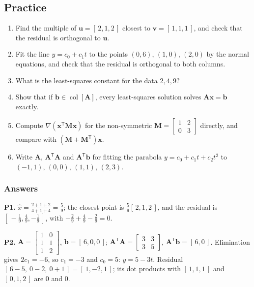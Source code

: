 \documentclass[11pt]{article}
\theoremstyle{plain}
\theoremstyle{definition}
\theoremstyle{remark}
\newcommand{\vc}[1]{\mathbf{#1}}
\newcommand{\mt}[1]{\mathbf{#1}}
\newcommand{\T}{^{\mathsf{T}}}
\newcommand{\colsp}[1]{\operatorname{col}[#1]}
\begin{document}
\subsection{Practice}
\begin{enumerate}[label=\textbf{P\arabic*.},leftmargin=2.6em,itemsep=5pt]
  \item Find the multiple of $\vc{u}=[\,2,1,2\,]$ closest to $\vc{v}=[\,1,1,1\,]$,
        and check that the residual is orthogonal to $\vc{u}$.
  \item Fit the line $y=c_0+c_1t$ to the points $(0,6)$, $(1,0)$, $(2,0)$ by the
        normal equations, and check that the residual is orthogonal to both
        columns.
  \item What is the least-squares constant for the data $2,4,9$?
  \item Show that if $\vc{b}\in\colsp{\mt{A}}$, every least-squares solution
        solves $\mt{A}\vc{x}=\vc{b}$ exactly.
  \item Compute $\nabla(\vc{x}\T\mt{M}\vc{x})$ for the non-symmetric
        $\mt{M}=\begin{bmatrix}1&2\\0&3\end{bmatrix}$ directly, and compare with
        $(\mt{M}+\mt{M}\T)\vc{x}$.
  \item Write $\mt{A}$, $\mt{A}\T\mt{A}$ and $\mt{A}\T\vc{b}$ for fitting the
        parabola $y=c_0+c_1t+c_2t^{2}$ to $(-1,1)$, $(0,0)$, $(1,1)$, $(2,3)$.
\end{enumerate}

\subsubsection*{Answers}

\noindent\textbf{P1.} $\hat x=\frac{2+1+2}{4+1+4}=\frac59$; the closest point is
$\frac59[\,2,1,2\,]$, and the residual is $[\,-\frac19,\frac49,-\frac19\,]$, with
$-\frac29+\frac49-\frac29=0$. \checkmark

\smallskip
\noindent\textbf{P2.} $\mt{A}=\begin{bmatrix}1&0\\1&1\\1&2\end{bmatrix}$,
$\vc{b}=[\,6,0,0\,]$; $\mt{A}\T\mt{A}=\begin{bmatrix}3&3\\3&5\end{bmatrix}$,
$\mt{A}\T\vc{b}=[\,6,0\,]$. Elimination gives $2c_1=-6$, so $c_1=-3$ and $c_0=5$:
$y=5-3t$. Residual $[\,6-5,\ 0-2,\ 0+1\,]=[\,1,-2,1\,]$; its dot products with
$[\,1,1,1\,]$ and $[\,0,1,2\,]$ are $0$ and $0$. \checkmark
\end{document}
